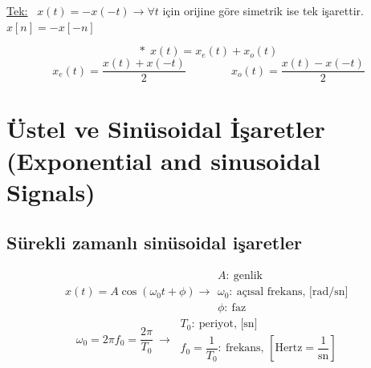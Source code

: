 \documentclass[11pt,a4paper]{article}
\begin{document}
\noindent
\begin{minipage}[c]{0.66\linewidth}
  \underline{Tek:} \ $x(t)=-x(-t)\longrightarrow \forall t$ için orijine göre simetrik ise tek işarettir.\\
  $x[n]=-x[-n]$
\end{minipage}\hfill
\begin{minipage}[c]{0.3\linewidth}
  \centering
\end{minipage}

\[ *\ \ x(t)=x_e(t)+x_o(t) \]
\[
  x_e(t)=\frac{x(t)+x(-t)}{2}\qquad\qquad x_o(t)=\frac{x(t)-x(-t)}{2}
\]

\section{Üstel ve Sinüsoidal İşaretler (Exponential and sinusoidal Signals)}
\subsection{Sürekli zamanlı sinüsoidal işaretler}
\[
  x(t)=A\cos(\omega_0 t+\phi)\longrightarrow
  \begin{array}{l}
    A:\ \text{genlik}\\
    \omega_0:\ \text{açısal frekans, [rad/sn]}\\
    \phi:\ \text{faz}
  \end{array}
\]
\[
  \omega_0=2\pi f_0=\frac{2\pi}{T_0}\ \longrightarrow\
  \begin{array}{l}
    T_0:\ \text{periyot, [sn]}\\[1mm]
    f_0=\dfrac{1}{T_0}:\ \text{frekans, } \left[\text{Hertz}=\dfrac{1}{\text{sn}}\right]
  \end{array}
\]
\end{document}
